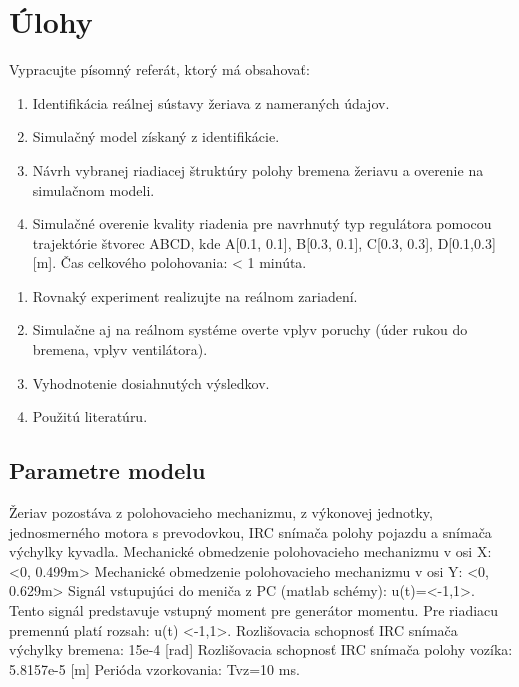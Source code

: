 \section{Úlohy}
Vypracujte písomný referát, ktorý má obsahovať:
\begin{enumerate}
    \item Identifikácia reálnej sústavy žeriava z nameraných údajov.
    \item Simulačný model získaný z identifikácie.
    \item Návrh vybranej riadiacej štruktúry polohy bremena žeriavu a overenie na simulačnom modeli.
    \item Simulačné overenie kvality riadenia pre navrhnutý typ regulátora pomocou trajektórie štvorec ABCD, kde A[0.1, 0.1], B[0.3, 0.1], C[0.3, 0.3], D[0.1,0.3] [m]. Čas celkového polohovania: < 1 minúta.
\end{enumerate}

\begin{enumerate}
    \item Rovnaký experiment realizujte na reálnom zariadení.
    \item Simulačne aj na reálnom systéme overte vplyv poruchy (úder rukou do bremena, vplyv ventilátora).
    \item Vyhodnotenie dosiahnutých výsledkov.
    \item Použitú literatúru.
\end{enumerate}
\subsection{Parametre modelu}

Žeriav pozostáva z polohovacieho mechanizmu, z výkonovej jednotky, jednosmerného motora s prevodovkou, IRC snímača polohy pojazdu a snímača výchylky kyvadla. \newline
Mechanické obmedzenie polohovacieho mechanizmu v osi X: <0, 0.499m>\newline
Mechanické obmedzenie polohovacieho mechanizmu v osi Y: <0, 0.629m>\newline
Signál vstupujúci do meniča z PC (matlab schémy): u(t)=<-1,1>. Tento signál predstavuje vstupný moment pre generátor momentu. Pre riadiacu premennú platí rozsah: u(t) <-1,1>. \newline
Rozlišovacia schopnosť IRC snímača výchylky bremena: 15e-4 [rad]\newline
Rozlišovacia schopnosť IRC snímača polohy vozíka: 5.8157e-5 [m]\newline
Perióda vzorkovania: Tvz=10 ms.\newline
